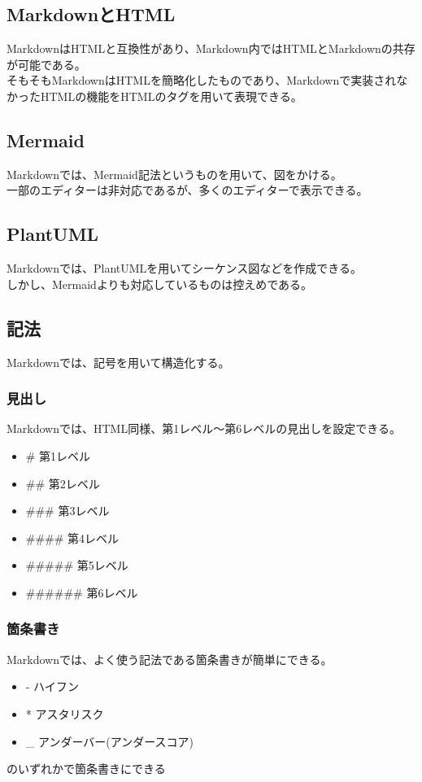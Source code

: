 \documentclass{ltjsarticle}
\begin{document}
\subsection{MarkdownとHTML}
MarkdownはHTMLと互換性があり、Markdown内ではHTMLとMarkdownの共存が可能である。\\
そもそもMarkdownはHTMLを簡略化したものであり、Markdownで実装されなかったHTMLの機能をHTMLのタグを用いて表現できる。
\subsection{Mermaid}
Markdownでは、Mermaid記法というものを用いて、図をかける。\\
一部のエディターは非対応であるが、多くのエディターで表示できる。
\subsection{PlantUML}
Markdownでは、PlantUMLを用いてシーケンス図などを作成できる。\\
しかし、Mermaidよりも対応しているものは控えめである。
\subsection{記法}
Markdownでは、記号を用いて構造化する。
\subsubsection{見出し}
Markdownでは、HTML同様、第1レベル～第6レベルの見出しを設定できる。
\begin{itemize}
    \item \# 第1レベル
    \item \#\# 第2レベル
    \item \#\#\# 第3レベル
    \item \#\#\#\# 第4レベル
    \item \#\#\#\#\# 第5レベル
    \item \#\#\#\#\#\# 第6レベル
\end{itemize}
\subsubsection{箇条書き}
Markdownでは、よく使う記法である箇条書きが簡単にできる。
\begin{itemize}
    \item - ハイフン
    \item * アスタリスク
    \item \_ アンダーバー(アンダースコア)
\end{itemize}
のいずれかで箇条書きにできる
\end{document}
